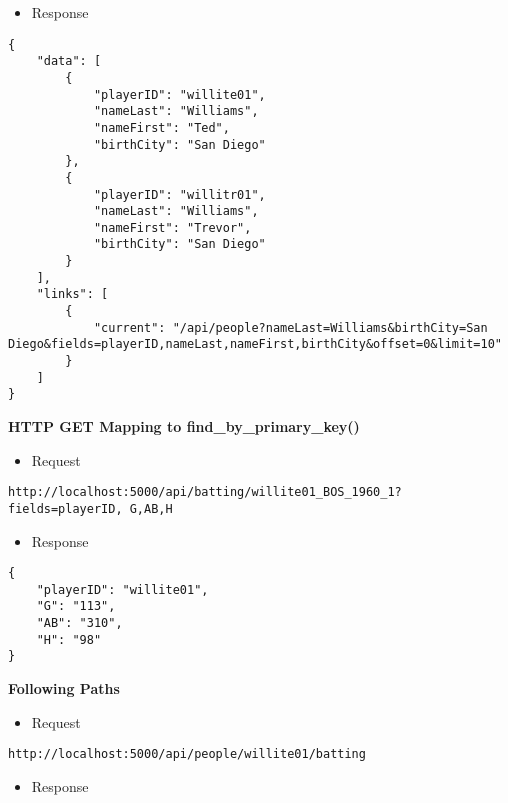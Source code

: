 \documentclass[11pt]{article}
\providecommand{\tightlist}{%
      \setlength{\itemsep}{0pt}\setlength{\parskip}{0pt}}
\begin{document}
\begin{itemize}
\tightlist
\item
  Response
\end{itemize}

\begin{verbatim}
{
    "data": [
        {
            "playerID": "willite01",
            "nameLast": "Williams",
            "nameFirst": "Ted",
            "birthCity": "San Diego"
        },
        {
            "playerID": "willitr01",
            "nameLast": "Williams",
            "nameFirst": "Trevor",
            "birthCity": "San Diego"
        }
    ],
    "links": [
        {
            "current": "/api/people?nameLast=Williams&birthCity=San Diego&fields=playerID,nameLast,nameFirst,birthCity&offset=0&limit=10"
        }
    ]
}
\end{verbatim}

    \textbf{HTTP GET Mapping to find\_by\_primary\_key()}

\begin{itemize}
\tightlist
\item
  Request
\end{itemize}

\begin{verbatim}
http://localhost:5000/api/batting/willite01_BOS_1960_1?fields=playerID, G,AB,H
\end{verbatim}

\begin{itemize}
\tightlist
\item
  Response
\end{itemize}

\begin{verbatim}
{
    "playerID": "willite01",
    "G": "113",
    "AB": "310",
    "H": "98"
}
\end{verbatim}

    \textbf{Following Paths}

\begin{itemize}
\tightlist
\item
  Request
\end{itemize}

\begin{verbatim}
http://localhost:5000/api/people/willite01/batting
\end{verbatim}

\begin{itemize}
\tightlist
\item
  Response
\end{itemize}
\end{document}
